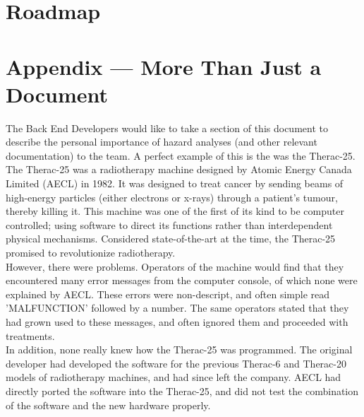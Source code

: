 \documentclass{article}
\begin{document}

\section{Roadmap}


\section*{Appendix --- More Than Just a Document}

The Back End Developers would like to take a section of this document to describe the personal importance of hazard analyses (and other relevant documentation) to the team. A perfect example of this is the was the Therac-25.\\

The Therac-25 was a radiotherapy machine designed by Atomic Energy Canada Limited (AECL) in 1982. It was designed to treat cancer by sending beams of high-energy particles (either electrons or x-rays) through a patient's tumour, thereby killing it. This machine was one of the first of its kind to be computer controlled; using software to direct its functions rather than interdependent physical mechanisms. Considered state-of-the-art at the time, the Therac-25 promised to revolutionize radiotherapy.\\

However, there were problems. Operators of the machine would find that they encountered many error messages from the computer console, of which none were explained by AECL. These errors were non-descript, and often simple read 'MALFUNCTION' followed by a number. The same operators stated that they had grown used to these messages, and often ignored them and proceeded with treatments.\\

In addition, none really knew how the Therac-25 was programmed. The original developer had developed the software for the previous Therac-6 and Therac-20 models of radiotherapy machines, and had since left the company. AECL had directly ported the software into the Therac-25, and did not test the combination of the software and the new hardware properly.\\
\end{document}
